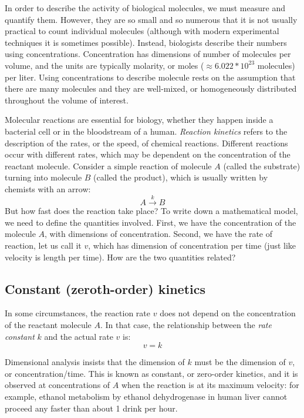 \documentclass[
  letterpaper,
  DIV=11,
  numbers=noendperiod]{scrreprt}
\begin{document}
In order to describe the activity of biological molecules, we must
measure and quantify them. However, they are so small and so numerous
that it is not usually practical to count individual molecules (although
with modern experimental techniques it is sometimes possible). Instead,
biologists describe their numbers using concentrations. Concentration
has dimensions of number of molecules per volume, and the units are
typically molarity, or moles (\(\approx 6.022*10^{23}\) molecules) per
liter. Using concentrations to describe molecule rests on the assumption
that there are many molecules and they are well-mixed, or homogeneously
distributed throughout the volume of interest.

Molecular reactions are essential for biology, whether they happen
inside a bacterial cell or in the bloodstream of a human. \emph{Reaction
kinetics}  refers to the description of the
rates, or the speed, of chemical reactions. Different reactions occur
with different rates, which may be dependent on the concentration of the
reactant molecule. Consider a simple reaction of molecule \(A\) (called
the substrate) turning into molecule \(B\) (called the product), which
is usually written by chemists with an arrow: \[
  A \xrightarrow{k} B
\] But how fast does the reaction take place? To write down a
mathematical model, we need to define the quantities involved. First, we
have the concentration of the molecule \(A\), with dimensions of
concentration. Second, we have the rate of reaction, let us call it
\(v\), which has dimension of concentration per time (just like velocity
is length per time). How are the two quantities related?

\hypertarget{constant-zeroth-order-kinetics}{%
\subsection{Constant (zeroth-order)
kinetics}\label{constant-zeroth-order-kinetics}}

 In some circumstances, the reaction rate
\(v\) does not depend on the concentration of the reactant molecule
\(A\). In that case, the relationship between the
 \emph{rate constant} \(k\) and the actual
rate \(v\) is: \begin{equation}
v = k
\label{eq:kinetics_0th_order}
\end{equation}

Dimensional analysis insists that the dimension of \(k\) must be the
dimension of \(v\), or concentration/time. This is known as constant, or
zero-order kinetics, and it is observed at concentrations of \(A\) when
the reaction is at its maximum velocity: for example, ethanol metabolism
by ethanol dehydrogenase in human liver cannot proceed any faster than
about 1 drink per hour.
\end{document}
